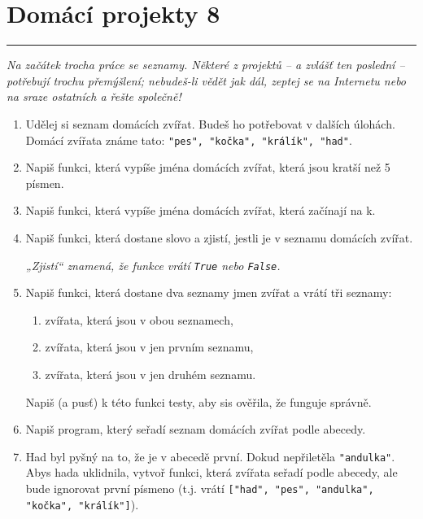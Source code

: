 \documentclass[a4paper,10pt]{article}
\newcommand\plsetno{8}
\newcommand\startsection[1]{
     \vspace{0.2ex}
    \hrule
    {\fontspec{Oxygen} \tiny
     \vspace{-1ex}
     \emph{#1}
     \vspace{-1.5em}
    }
}
\begin{document}
\section*{Domácí projekty \plsetno}

\startsection{Na začátek trocha práce se seznamy.
    Některé z projektů – a zvlášť ten poslední – potřebují trochu přemýšlení;
    nebudeš-li vědět jak dál, zeptej se na Internetu nebo na sraze ostatních
    a řešte společně!}

\begin{enumerate}

\item Udělej si seznam domácích zvířat. Budeš ho potřebovat v dalších úlohách.
    \\Domácí zvířata známe tato: \verb+"pes", "kočka", "králík", "had"+.


\item Napiš funkci, která vypíše jména domácích zvířat, která jsou kratší než 5 písmen.

\item Napiš funkci, která vypíše jména domácích zvířat, která začínají na k.

\item Napiš funkci, která dostane slovo a zjistí,
    jestli je v seznamu domácích zvířat.

    \emph{„Zjistí“ znamená, že funkce vrátí \texttt{True} nebo \texttt{False}.}

\item Napiš funkci, která dostane dva seznamy jmen zvířat a vrátí tři seznamy:
    \begin{enumerate}
        \item zvířata, která jsou v obou seznamech,
        \item zvířata, která jsou v jen prvním seznamu,
        \item zvířata, která jsou v jen druhém seznamu.
    \end{enumerate}
    Napiš (a pusť) k této funkci testy, aby sis ověřila, že funguje správně.

\item Napiš program, který seřadí seznam domácích zvířat podle abecedy.

\item Had byl pyšný na to, že je v abecedě první.
    Dokud nepřiletěla \verb+"andulka"+.
    \\Abys hada uklidnila, vytvoř funkci, která zvířata seřadí podle abecedy,
    ale bude ignorovat první písmeno (t.j. vrátí
        \texttt{["h{\color{plpink}ad}",
                 "p{\color{plpink}es}",
                 "a{\color{plpink}ndulka}",
                 "k{\color{plpink}očka}",
                 "k{\color{plpink}rálík}"]}).


\end{enumerate}
\end{document}
